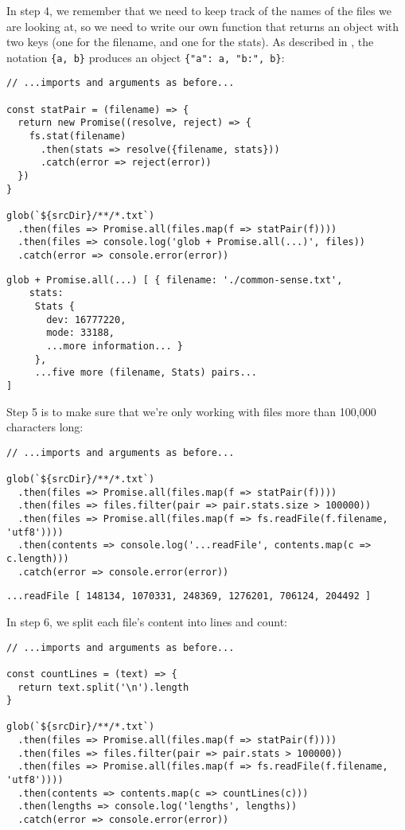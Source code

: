 In step 4,
we remember that we need to keep track of the names of the files we are looking at,
so we need to write our own function that returns an object with two keys
(one for the filename, and one for the stats).
As described in ,
the notation \texttt{\{a,\ b\}} produces an object \texttt{\{"a":\ a,\ "b:",\ b\}}:

\begin{verbatim}
// ...imports and arguments as before...

const statPair = (filename) => {
  return new Promise((resolve, reject) => {
    fs.stat(filename)
      .then(stats => resolve({filename, stats}))
      .catch(error => reject(error))
  })
}

glob(`${srcDir}/**/*.txt`)
  .then(files => Promise.all(files.map(f => statPair(f))))
  .then(files => console.log('glob + Promise.all(...)', files))
  .catch(error => console.error(error))
\end{verbatim}

\begin{verbatim}
glob + Promise.all(...) [ { filename: './common-sense.txt',
    stats:
     Stats {
       dev: 16777220,
       mode: 33188,
       ...more information... }
     },
     ...five more (filename, Stats) pairs...
]
\end{verbatim}

Step 5 is to make sure that
we're only working with files more than 100,000 characters long:

\begin{verbatim}
// ...imports and arguments as before...

glob(`${srcDir}/**/*.txt`)
  .then(files => Promise.all(files.map(f => statPair(f))))
  .then(files => files.filter(pair => pair.stats.size > 100000))
  .then(files => Promise.all(files.map(f => fs.readFile(f.filename, 'utf8'))))
  .then(contents => console.log('...readFile', contents.map(c => c.length)))
  .catch(error => console.error(error))
\end{verbatim}

\begin{verbatim}
...readFile [ 148134, 1070331, 248369, 1276201, 706124, 204492 ]
\end{verbatim}

In step 6,
we split each file's content into lines and count:

\begin{verbatim}
// ...imports and arguments as before...

const countLines = (text) => {
  return text.split('\n').length
}

glob(`${srcDir}/**/*.txt`)
  .then(files => Promise.all(files.map(f => statPair(f))))
  .then(files => files.filter(pair => pair.stats > 100000))
  .then(files => Promise.all(files.map(f => fs.readFile(f.filename, 'utf8'))))
  .then(contents => contents.map(c => countLines(c)))
  .then(lengths => console.log('lengths', lengths))
  .catch(error => console.error(error))
\end{verbatim}

